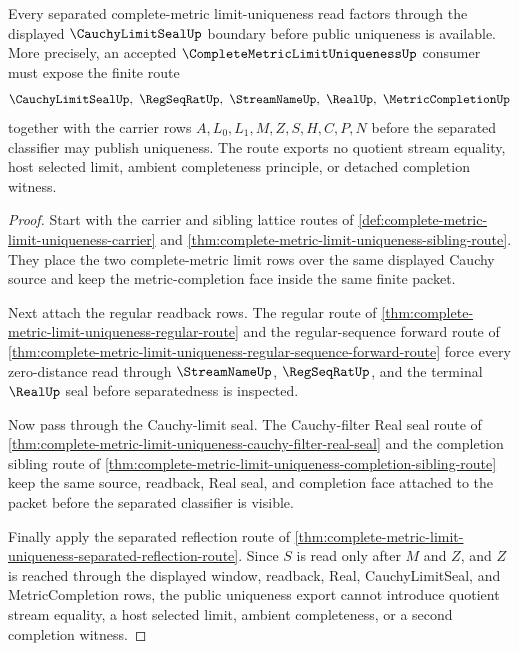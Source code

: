 \begin{theorem}
\label{thm:complete-metric-limit-uniqueness-cauchy-limitseal-route}
Every separated complete-metric limit-uniqueness read factors through the displayed $\CauchyLimitSealUp$ boundary before public uniqueness is available. More precisely, an accepted $\CompleteMetricLimitUniquenessUp$ consumer must expose the finite route
$$
\CauchyLimitSealUp,\ \RegSeqRatUp,\ \StreamNameUp,\ \RealUp,\ \MetricCompletionUp
$$
together with the carrier rows $A,L_{0},L_{1},M,Z,S,H,C,P,N$ before the separated classifier may publish uniqueness. The route exports no quotient stream equality, host selected limit, ambient completeness principle, or detached completion witness.
\end{theorem}
\begin{proof}
Start with the carrier and sibling lattice routes of \autoref{def:complete-metric-limit-uniqueness-carrier} and \autoref{thm:complete-metric-limit-uniqueness-sibling-route}. They place the two complete-metric limit rows over the same displayed Cauchy source and keep the metric-completion face inside the same finite packet.

Next attach the regular readback rows. The regular route of \autoref{thm:complete-metric-limit-uniqueness-regular-route} and the regular-sequence forward route of \autoref{thm:complete-metric-limit-uniqueness-regular-sequence-forward-route} force every zero-distance read through $\StreamNameUp$, $\RegSeqRatUp$, and the terminal $\RealUp$ seal before separatedness is inspected.

Now pass through the Cauchy-limit seal. The Cauchy-filter Real seal route of \autoref{thm:complete-metric-limit-uniqueness-cauchy-filter-real-seal} and the completion sibling route of \autoref{thm:complete-metric-limit-uniqueness-completion-sibling-route} keep the same source, readback, Real seal, and completion face attached to the packet before the separated classifier is visible.

Finally apply the separated reflection route of \autoref{thm:complete-metric-limit-uniqueness-separated-reflection-route}. Since $S$ is read only after $M$ and $Z$, and $Z$ is reached through the displayed window, readback, Real, CauchyLimitSeal, and MetricCompletion rows, the public uniqueness export cannot introduce quotient stream equality, a host selected limit, ambient completeness, or a second completion witness.
\end{proof}
